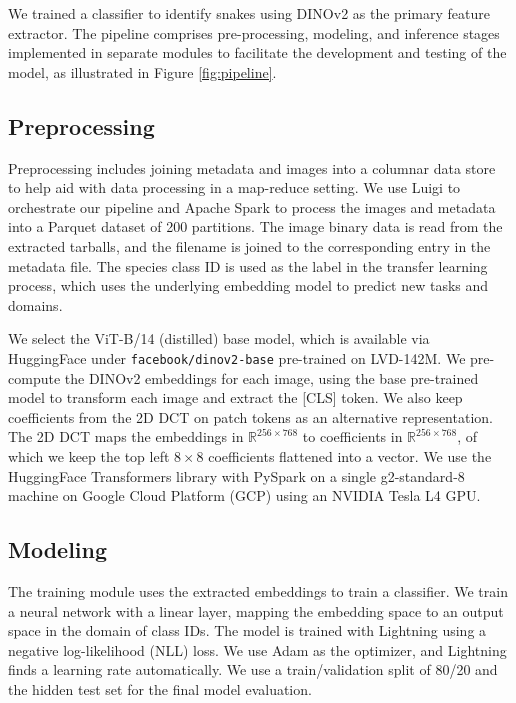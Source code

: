 \documentclass[]{ceurart}
\begin{document}
We trained a classifier to identify snakes using DINOv2 as the primary feature extractor.
The pipeline comprises pre-processing, modeling, and inference stages implemented in separate modules to facilitate the development and testing of the model, as illustrated in Figure \ref{fig:pipeline}.


\subsection{Preprocessing}

Preprocessing includes joining metadata and images into a columnar data store to help aid with data processing in a map-reduce setting.
We use Luigi to orchestrate our pipeline and Apache Spark to process the images and metadata into a Parquet dataset of 200 partitions.
The image binary data is read from the extracted tarballs, and the filename is joined to the corresponding entry in the metadata file.
The species class ID is used as the label in the transfer learning process, which uses the underlying embedding model to predict new tasks and domains.

We select the ViT-B/14 (distilled) base model, which is available via HuggingFace under \texttt{facebook/dinov2-base} pre-trained on LVD-142M.
We pre-compute the DINOv2 embeddings for each image, using the base pre-trained model to transform each image and extract the [CLS] token.
We also keep coefficients from the 2D DCT on patch tokens as an alternative representation.
The 2D DCT maps the embeddings in $\mathbb{R}^{256 \times 768}$ to coefficients in $\mathbb{R}^{256 \times 768}$, of which we keep the top left $8\times8$ coefficients flattened into a vector.
We use the HuggingFace Transformers library with PySpark on a single g2-standard-8 machine on Google Cloud Platform (GCP) using an NVIDIA Tesla L4 GPU.

\subsection{Modeling}

The training module uses the extracted embeddings to train a classifier.
We train a neural network with a linear layer, mapping the embedding space to an output space in the domain of class IDs.
The model is trained with Lightning using a negative log-likelihood (NLL) loss.
We use Adam as the optimizer, and Lightning finds a learning rate automatically.
We use a train/validation split of 80/20 and the hidden test set for the final model evaluation.
\end{document}
